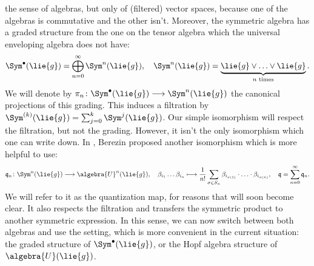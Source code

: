 the sense of algebras, but only of (filtered) vector spaces, because one of 
the algebras is commutative and the other isn't. Moreover, the symmetric 
algebra has a graded structure from the one on the tensor algebra which the 
universal enveloping algebra does not have:
\begin{equation*}
	\Sym^{\bullet}(\lie{g})
	=
	\bigoplus\limits_{n = 0}^{\infty}
	\Sym^n(\lie{g})
	, \quad
	\Sym^n(\lie{g})
	=
	\underbrace{
		\lie{g} \vee \ldots \vee \lie{g}
	}_{
		n \text{ times}
	}.
\end{equation*}
We will denote by $\pi_n \colon \Sym^{\bullet}(\lie{g}) \longrightarrow
\Sym^n(\lie{g})$ the canonical projections of this grading.
This induces a filtration by $\Sym^{(k)}(\lie{g}) = \sum_{j=0}^k 
\Sym^j(\lie{g})$. Our simple isomorphism will respect the filtration, but 
not the grading. However, it isn't the only isomorphism which one can write 
down. In \cite{berezin:1967a}, Berezin proposed another isomorphism which is 
more helpful to use:
\begin{equation}
	\label{Alg:BerezinQuantization}
	\mathfrak{q}_n
	\colon
	\Sym^n(\lie{g})
	\longrightarrow
	\algebra{U}^n(\lie{g})
	, \quad
	\beta_{i_1} \ldots \beta_{i_n}
	\longmapsto
	\frac{1}{n!}
	\sum\limits_{\sigma \in S_n}
	\beta_{i_{\sigma(1)}} 
	\cdot \ldots \cdot
	\beta_{i_{\sigma(n)}}
	, \quad
	\mathfrak{q}
	=
	\sum\limits_{n = 0}^{\infty}
	\mathfrak{q}_n.
\end{equation}
We will refer to it as the quantization map, for reasons that will soon 
become clear. It also respects the filtration and transfers the symmetric 
product to another symmetric expression. In this sense, we can now switch 
between both algebras and use the setting, which is more convenient in the 
current situation: the graded structure of $\Sym^{\bullet}(\lie{g})$, or the 
Hopf algebra structure of $\algebra{U}(\lie{g})$.


